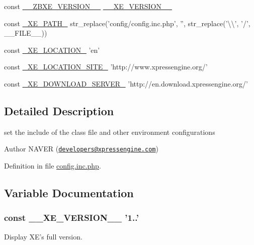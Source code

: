 \begin{DoxyCompactItemize}
\item 
const \hyperlink{config_8inc_8php_a0e70c145bf3712e075af5c3861045dc9}{\+\_\+\+\_\+\+Z\+B\+X\+E\+\_\+\+V\+E\+R\+S\+I\+O\+N\+\_\+\+\_\+} \hyperlink{config_8inc_8php_afceaaec30d0e5b6a78d0ae28bcbfc8f3}{\+\_\+\+\_\+\+X\+E\+\_\+\+V\+E\+R\+S\+I\+O\+N\+\_\+\+\_\+}
\item 
const \hyperlink{config_8inc_8php_a5387c7a3f2aa38adf16f324cee88db88}{\+\_\+\+X\+E\+\_\+\+P\+A\+T\+H\+\_\+} str\+\_\+replace('config/config.\+inc.\+php', '', str\+\_\+replace('\textbackslash{}\textbackslash{}', '/', \+\_\+\+\_\+\+F\+I\+L\+E\+\_\+\+\_\+))
\item 
const \hyperlink{config_8inc_8php_a7330debbfb3a027cdd5f3d3dd1dfbdd0}{\+\_\+\+X\+E\+\_\+\+L\+O\+C\+A\+T\+I\+O\+N\+\_\+} 'en'
\item 
const \hyperlink{config_8inc_8php_a063bfd2eb9f811b1676d0dbc0cad2648}{\+\_\+\+X\+E\+\_\+\+L\+O\+C\+A\+T\+I\+O\+N\+\_\+\+S\+I\+T\+E\+\_\+} 'http\+://www.\+xpressengine.\+org/'
\item 
const \hyperlink{config_8inc_8php_a22df32d3e0eae0d60d6cddb9ec99d5ec}{\+\_\+\+X\+E\+\_\+\+D\+O\+W\+N\+L\+O\+A\+D\+\_\+\+S\+E\+R\+V\+E\+R\+\_\+} 'http\+://en.\+download.\+xpressengine.\+org/'
\end{DoxyCompactItemize}


\subsection{Detailed Description}
set the include of the class file and other environment configurations

\begin{DoxyAuthor}{Author}
N\+A\+V\+E\+R (\href{mailto:developers@xpressengine.com}{\tt developers@xpressengine.\+com}) 
\end{DoxyAuthor}


Definition in file \hyperlink{config_8inc_8php_source}{config.\+inc.\+php}.



\subsection{Variable Documentation}
\hypertarget{config_8inc_8php_afceaaec30d0e5b6a78d0ae28bcbfc8f3}{
\subsubsection[{\+\_\+\+\_\+\+X\+E\+\_\+\+V\+E\+R\+S\+I\+O\+N\+\_\+\+\_\+}]{\setlength{\rightskip}{0pt plus 5cm}const \+\_\+\+\_\+\+X\+E\+\_\+\+V\+E\+R\+S\+I\+O\+N\+\_\+\+\_\+ '1..'}}\label{config_8inc_8php_afceaaec30d0e5b6a78d0ae28bcbfc8f3}
Display X\+E's full version. 

